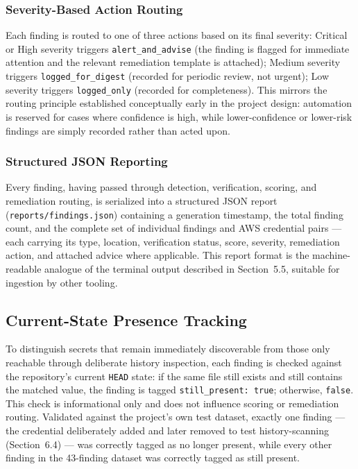 \documentclass[12pt]{article}
\begin{document}
\subsubsection{Severity-Based Action Routing}

Each finding is routed to one of three actions based on its final severity: Critical or High severity triggers \texttt{alert\_and\_advise} (the finding is flagged for immediate attention and the relevant remediation template is attached); Medium severity triggers \texttt{logged\_for\_digest} (recorded for periodic review, not urgent); Low severity triggers \texttt{logged\_only} (recorded for completeness). This mirrors the routing principle established conceptually early in the project design: automation is reserved for cases where confidence is high, while lower-confidence or lower-risk findings are simply recorded rather than acted upon.

\subsubsection{Structured JSON Reporting}

Every finding, having passed through detection, verification, scoring, and remediation routing, is serialized into a structured JSON report (\texttt{reports/findings.json}) containing a generation timestamp, the total finding count, and the complete set of individual findings and AWS credential pairs --- each carrying its type, location, verification status, score, severity, remediation action, and attached advice where applicable. This report format is the machine-readable analogue of the terminal output described in Section~5.5, suitable for ingestion by other tooling.

\subsection{Current-State Presence Tracking}

To distinguish secrets that remain immediately discoverable from those only reachable through deliberate history inspection, each finding is checked against the repository's current \texttt{HEAD} state: if the same file still exists and still contains the matched value, the finding is tagged \texttt{still\_present: true}; otherwise, \texttt{false}. This check is informational only and does not influence scoring or remediation routing. Validated against the project's own test dataset, exactly one finding --- the credential deliberately added and later removed to test history-scanning (Section~6.4) --- was correctly tagged as no longer present, while every other finding in the 43-finding dataset was correctly tagged as still present.
\end{document}
